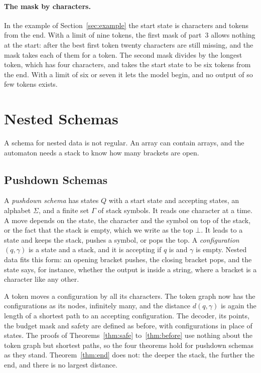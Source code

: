 \documentclass[acmsmall,nonacm,screen]{acmart}
\newcommand{\far}{d}
\newcommand{\claim}[2]{#2}
\begin{document}
\paragraph{The mask by characters.} In the example of Section~\ref{sec:example} the start
state is \exExampleCharacters{} characters and \exExampleFar{} tokens from the end.
\claim{example-characters}{With a limit of nine tokens, the first mask of part~3 allows
nothing at the start: after the best first token twenty characters are still missing, and
the mask takes each of them for a token. The second mask divides by the longest token, which
has four characters, and takes the start state to be six tokens from the end. With a limit of
six or seven it lets the model begin, and no output of so few tokens exists.}

\section{Nested Schemas}\label{sec:nested}

A schema for nested data is not regular. An array can contain arrays, and the automaton needs
a stack to know how many brackets are open.

\subsection{Pushdown Schemas}

A \emph{pushdown schema} has states $Q$ with a start state and accepting states, an alphabet
$\Sigma$, and a finite set $\Gamma$ of stack symbols. It reads one character at a time. A
move depends on the state, the character and the symbol on top of the stack, or the fact
that the stack is empty, which we write as the top $\bot$. It leads to a state and keeps the
stack, pushes a symbol, or pops the top. A \emph{configuration} $(q, \gamma)$ is a state and
a stack, and it is accepting if $q$ is and $\gamma$ is empty. Nested data fits this form: an
opening bracket pushes, the closing bracket pops, and the state says, for instance, whether
the output is inside a string, where a bracket is a character like any other.

A token moves a configuration by all its characters. The token graph now has the
configurations as its nodes, infinitely many, and the distance $\far(q, \gamma)$ is again
the length of a shortest path to an accepting configuration. The decoder, its points, the
budget mask and safety are defined as before, with configurations in place of states. The
proofs of Theorems~\ref{thm:safe} to~\ref{thm:before} use nothing about the token graph but
shortest paths, so the four theorems hold for pushdown schemas as they stand.
Theorem~\ref{thm:end} does not: the deeper the stack, the further the end, and there is no
largest distance.
\end{document}
